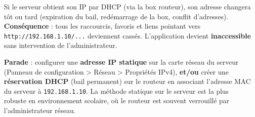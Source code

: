 \documentclass[11pt]{article}
\begin{document}
\begin{attention}
Si le serveur obtient son IP par DHCP (via la box routeur), son adresse changera tôt ou tard (expiration du bail, redémarrage de la box, conflit d'adresses). \textbf{Conséquence} : tous les raccourcis, favoris et liens pointant vers \texttt{http://192.168.1.10/...} deviennent cassés. L'application devient \textbf{inaccessible} sans intervention de l'administrateur.

\textbf{Parade} : configurer une \textbf{adresse IP statique} sur la carte réseau du serveur (Panneau de configuration \textgreater{} Réseau \textgreater{} Propriétés IPv4), \textbf{et/ou} créer une \textbf{réservation DHCP} (bail permanent) sur le routeur en associant l'adresse MAC du serveur à \texttt{192.168.1.10}. La méthode statique sur le serveur est la plus robuste en environnement scolaire, où le routeur est souvent verrouillé par l'administrateur réseau.
\end{attention}
\end{document}
